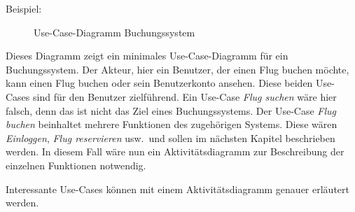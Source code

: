 Beispiel:

\begin{figure}[ht]
\centering
\caption{Use-Case-Diagramm Buchungssystem}
\end{figure}

Dieses Diagramm zeigt ein minimales Use-Case-Diagramm für ein Buchungssystem.
Der Akteur, hier ein Benutzer, der einen Flug buchen möchte, kann einen Flug buchen oder sein Benutzerkonto ansehen.
Diese beiden Use-Cases sind für den Benutzer zielführend.
Ein Use-Case \emph{Flug suchen} wäre hier falsch, denn das ist nicht das Ziel eines Buchungssystems. 
Der Use-Case \emph{Flug buchen} beinhaltet mehrere Funktionen des zugehörigen Systems. 
Diese wären \emph{Einloggen}, \emph{Flug reservieren} usw.\ und sollen im nächsten Kapitel beschrieben werden.
In diesem Fall wäre nun ein Aktivitätsdiagramm zur Beschreibung der einzelnen Funktionen notwendig.


Interessante Use-Cases können mit einem Aktivitätsdiagramm genauer erläutert werden.
